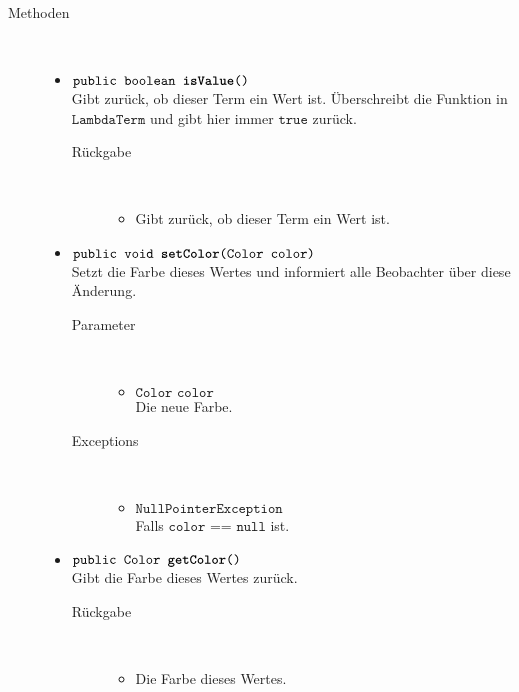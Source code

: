 \begin{description}
\item[Methoden] \hfill \\
	\vspace{-.8cm}
	\begin{itemize}
		\item $\texttt{public boolean \textbf{isValue}()}$ \\ Gibt zurück, ob dieser Term ein Wert ist. Überschreibt die Funktion in $\texttt{LambdaTerm}$ und gibt hier immer $\texttt{true}$ zurück.
		\begin{description}
			\item[Rückgabe] \hfill \\
			\vspace{-.8cm}
			\begin{itemize}
				\item Gibt zurück, ob dieser Term ein Wert ist.
			\end{itemize}
		\end{description}
		
		\item $\texttt{public void \textbf{setColor}(Color color)}$ \\ Setzt die Farbe dieses Wertes und informiert alle Beobachter über diese Änderung.
		\begin{description}
			\item[Parameter] \hfill \\
			\vspace{-.8cm}
			\begin{itemize}
				\item $\texttt{Color color}$ \\ Die neue Farbe.
			\end{itemize}
			\item[Exceptions] \hfill \\
			\vspace{-.8cm}
			\begin{itemize}
				\item $\texttt{NullPointerException}$ \\ Falls $\texttt{color == null}$ ist.
			\end{itemize}
		\end{description}
		
		\item $\texttt{public Color \textbf{getColor}()}$ \\ Gibt die Farbe dieses Wertes zurück.
		\begin{description}
			\item[Rückgabe] \hfill \\
			\vspace{-.8cm}
			\begin{itemize}
				\item Die Farbe dieses Wertes.
			\end{itemize}
		\end{description}
	\end{itemize}
\end{description}

